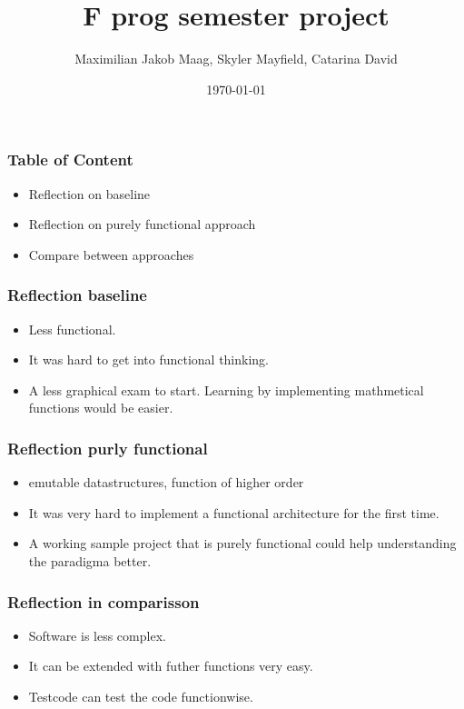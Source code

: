 \documentclass{beamer}
\title{F prog semester project}
\author{Maximilian Jakob Maag, Skyler Mayfield, Catarina David}
\date{\today}
\begin{document}
	\begin{frame}
		\titlepage
	\end{frame}
	\begin{frame}
		\frametitle{Table of Content}
		\begin{itemize}
			\item Reflection on baseline
			\item Reflection on purely functional approach
			\item Compare between approaches
		\end{itemize}
	\end{frame}
	\begin{frame}
		\frametitle{Reflection baseline}
		\begin{itemize}
			\item Less functional.
			\item It was hard to get into functional thinking.
			\item A less graphical exam to start. Learning by implementing mathmetical functions would be easier.
		\end{itemize}
	\end{frame}
	\begin{frame}
		\frametitle{Reflection purly functional}
		\begin{itemize}
			\item emutable datastructures, function of higher order
			\item It was very hard to implement a functional architecture for the first time.
			\item A working sample project that is purely functional could help understanding the paradigma better.
		\end{itemize}
	\end{frame}
	\begin{frame}
		\frametitle{Reflection in comparisson}
		\begin{itemize}
			\item Software is less complex.
			\item It can be extended with futher functions very easy.
			\item Testcode can test the code functionwise.
		\end{itemize}
	\end{frame}
\end{document}
